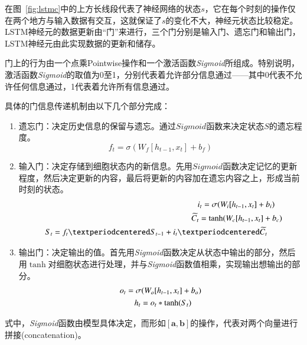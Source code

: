 在图~\ref{fig:lstmc}中的上方长线段代表了神经网络的状态$s$，它在每个时刻的操作仅在两个地方与输入数据有交互，这就保证了$s$的变化不大，神经元状态比较稳定。LSTM神经元的数据更新由“门”来进行，三个门分别是输入门、遗忘门和输出门，LSTM神经元由此实现数据的更新和储存。

门上的行为由一个点乘Pointwise操作和一个激活函数\textit{Sigmoid}所组成。特别说明，激活函数\textit{Sigmoid}的取值为0至1，分别代表着允许部分信息通过——其中0代表不允许任何信息通过，1代表着允许所有信息通过。

具体的门信息传递机制由以下几个部分完成：
\begin{enumerate}[fullwidth,itemindent=2em,label=\arabic*.]
  \item 遗忘门：决定历史信息的保留与遗忘。通过$Sigmoid$函数来决定状态$S$的遗忘程度。
  \begin{equation}
    f_t=\sigma(W_f[h_{t-1}, x_t]+b_f)
    \label{forget}
  \end{equation}
  \item 输入门：决定存储到细胞状态内的新信息。先用$Sigmoid$函数决定记忆的更新程度，然后决定更新的内容，最后将更新的内容加在遗忘内容之上，形成当前时刻的状态。
  \begin{equation}
    \begin{split}
      i_t=\sigma(W_i[h_{t-1}, x_t]+b_i)\hspace{0.2em}\\
      \widetilde{C_t}=\tanh(W_c[h_{t-1}, x_t]+b_c)\hspace{-0.7em}\\
      S_t = f_t·S_{t-1} + i_t · \widetilde{C_t}\hspace{1.1em}
    \end{split}
    \label{input}
  \end{equation}
  \item 输出门：决定输出的值。首先用\textit{Sigmoid}函数决定从状态中输出的部分，然后用$\tanh$对细胞状态进行处理，并与\textit{Sigmoid}函数值相乘，实现输出想输出的部分。
  \begin{equation}
    \begin{split}
      o_t = \sigma(W_o[h_{t-1}, x_t] + b_o)\\
      h_t = o_t*\tanh(S_t)\hspace{1.2em}
    \end{split}
    \label{output}
  \end{equation}
\end{enumerate}
式中，\textit{Sigmoid}函数由模型具体决定，而形如$[\textbf{a}, \textbf{b}]$的操作，代表对两个向量进行拼接(concatenation)。

